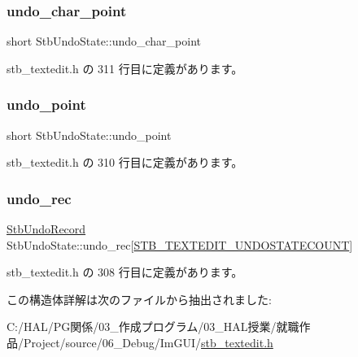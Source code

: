 \subsubsection{\texorpdfstring{undo\+\_\+char\+\_\+point}{undo\_char\_point}}
{\footnotesize\ttfamily short Stb\+Undo\+State\+::undo\+\_\+char\+\_\+point}



 stb\+\_\+textedit.\+h の 311 行目に定義があります。

\mbox{\label{struct_stb_undo_state_ad29a8695b3e8252ac164d0c2d0be7d7c}} 
\subsubsection{\texorpdfstring{undo\+\_\+point}{undo\_point}}
{\footnotesize\ttfamily short Stb\+Undo\+State\+::undo\+\_\+point}



 stb\+\_\+textedit.\+h の 310 行目に定義があります。

\mbox{\label{struct_stb_undo_state_a8cb07be8f304d1620b50bd024709023f}} 
\subsubsection{\texorpdfstring{undo\+\_\+rec}{undo\_rec}}
{\footnotesize\ttfamily \mbox{\hyperlink{struct_stb_undo_record}{Stb\+Undo\+Record}} Stb\+Undo\+State\+::undo\+\_\+rec\mbox{[}\mbox{\hyperlink{stb__textedit_8h_afa79483143df87a1497010712b3dfaf9}{S\+T\+B\+\_\+\+T\+E\+X\+T\+E\+D\+I\+T\+\_\+\+U\+N\+D\+O\+S\+T\+A\+T\+E\+C\+O\+U\+NT}}\mbox{]}}



 stb\+\_\+textedit.\+h の 308 行目に定義があります。



この構造体詳解は次のファイルから抽出されました\+:\begin{DoxyCompactItemize}
\item 
C\+:/\+H\+A\+L/\+P\+G関係/03\+\_\+作成プログラム/03\+\_\+\+H\+A\+L授業/就職作品/\+Project/source/06\+\_\+\+Debug/\+Im\+G\+U\+I/\mbox{\hyperlink{stb__textedit_8h}{stb\+\_\+textedit.\+h}}\end{DoxyCompactItemize}
